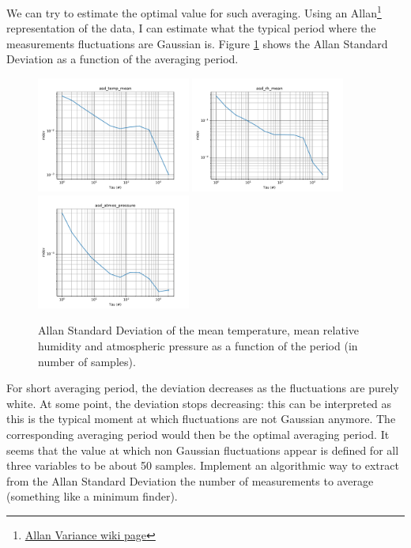 \documentclass[11pt]{amsart}
\begin{document}
We can try to estimate the optimal value for such averaging.
Using an Allan\footnote{\href{https://en.wikipedia.org/wiki/Allan_variance}{Allan Variance wiki page}} representation of the data, I can estimate what the typical period where the measurements fluctuations are Gaussian is.
Figure \ref{fig:asd} shows the Allan Standard Deviation as a function of the averaging period.
\begin{figure}
\includegraphics[width=0.45\textwidth]{../plots/asd_temp_mean.pdf}
\includegraphics[width=0.45\textwidth]{../plots/asd_rh_mean.pdf}
\includegraphics[width=0.45\textwidth]{../plots/asd_atmos_pressure.pdf}
\caption{\label{fig:asd}Allan Standard Deviation of the mean temperature, mean relative humidity and atmospheric pressure as a function of the period (in number of samples).}
\end{figure}
For short averaging period, the deviation decreases as the fluctuations are purely white.
At some point, the deviation stops decreasing: this can be interpreted as this is the typical moment at which fluctuations are not Gaussian anymore.
The corresponding averaging period would then be the optimal averaging period.
It seems that the value at which non Gaussian fluctuations appear is defined for all three variables to be about 50 samples.
{\tgf Implement an algorithmic way to extract from the Allan Standard Deviation the number of measurements to average (something like a minimum finder).}
\end{document}
